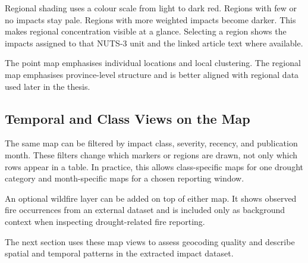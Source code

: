 Regional shading uses a colour scale from light to dark red. Regions with few or no impacts stay pale. Regions with more weighted impacts become darker. This makes regional concentration visible at a glance. Selecting a region shows the impacts assigned to that NUTS-3 unit and the linked article text where available.

The point map emphasises individual locations and local clustering. The regional map emphasises province-level structure and is better aligned with regional data used later in the thesis.

\subsection{Temporal and Class Views on the Map}

The same map can be filtered by impact class, severity, recency, and publication month. These filters change which markers or regions are drawn, not only which rows appear in a table. In practice, this allows class-specific maps for one drought category and month-specific maps for a chosen reporting window.

An optional wildfire layer can be added on top of either map. It shows observed fire occurrences from an external dataset and is included only as background context when inspecting drought-related fire reporting.

The next section uses these map views to assess geocoding quality and describe spatial and temporal patterns in the extracted impact dataset.




